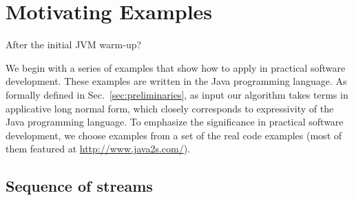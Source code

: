 \section{Motivating Examples}
\label{sec:examples}

After the initial JVM warm-up?  

We begin with a series of examples that show how to apply \ourTool in practical software
development. These examples are written in the Java programming
language. As formally defined in Sec.~\ref{sec:preliminaries},
as input our algorithm takes terms in applicative long normal
form, which closely corresponds to expressivity of the Java programming language.
To emphasize the significance in practical software development, 
we choose examples from a set of the real code examples (most of them featured at
\url{http://www.java2s.com/}{}).

%
%


\subsection{Sequence of streams}

